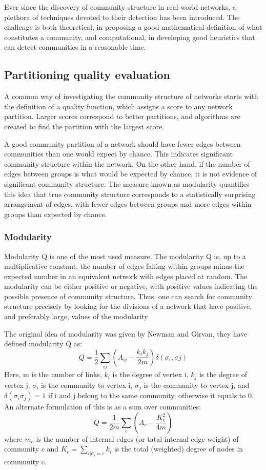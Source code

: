 \indent Ever since the discovery of community structure in real-world networks, a plethora of techniques devoted to their detection has been introduced. The challenge is both theoretical, in proposing a good mathematical definition of what constitutes a community, and computational, in developing good heuristics that can detect communities in a reasonable time.
\subsection{Partitioning quality evaluation}
A common way of investigating the community structure of networks starts with the definition of a quality function, which assigns a score to any network partition. Larger scores correspond to better partitions, and algorithms are created to find the partition with the largest score.

A good community partition of a network should have fewer edges between communities than one would expect by chance. This indicates significant community structure within the network. On the other hand, if the number of edges between groups is what would be expected by chance, it is not evidence of significant community structure. The measure known as modularity quantifies this idea that true community structure corresponds to a statistically surprising arrangement of edges, with fewer edges between groups and more edges within groups than expected by chance.
\subsubsection{Modularity}
Modularity Q is one of the most used measure. The modularity Q is, up to a multiplicative constant, the number of edges falling within groups minus the expected number in an equivalent network with edges placed at random. The modularity can be either positive or negative, with positive values indicating the possible presence of community structure. Thus, one can search for community structure precisely by looking for the divisions of a network that have positive, and preferably large, values of the modularity

The original idea of modularity was given by Newman and Girvan, they have defined modularity Q as:\\
$$Q=\frac{1}{2}\sum_{ij}(A_{ij}-\frac{k_{i}k_{j}}{2m})\delta(\sigma_{i},\sigma{j})$$
Here, m is the number of links, $k_{i}$ is the degree of vertex i, $k_{j}$ is the degree of vertex j, $\sigma_{i}$ is the community to vertex i, $\sigma_{j}$ is the community to vertex j, and $\delta(\sigma_{i}\sigma_{j}) = 1$ if i and j belong to the same community, otherwise it equals to 0.\\
An alternate formulation of this is as a sum over communities:
$$Q=\frac{1}{2m}\sum_{c}(A_{c}-\frac{K_{c}^{2}}{4m})$$
where $m_{c}$ is the number of internal edges (or tatal internal edge weight) of community $c$ and $K_{c} = \sum_{i|\sigma_{i}=c}k_{i}$ is the total (weighted) degree of nodes in community $c$.
